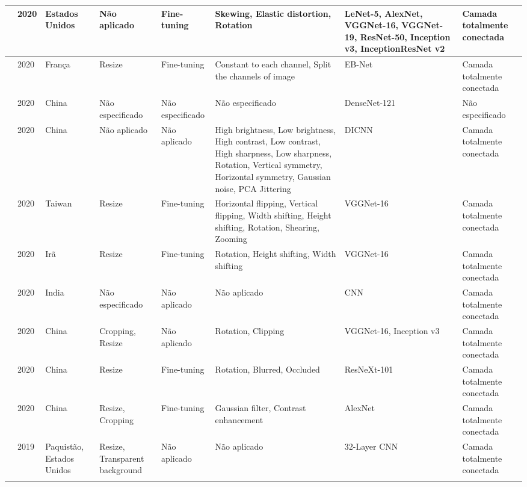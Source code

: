 \documentclass[
	12pt,				%
	oneside,			%
	a4paper,			%
	english,			%
	brazil				%
	]{abntex2ppgsi}
\begin{document}
\begin{landscape}
\begin{OnehalfSpacing}
\begin{footnotesize}
\begin{longtable}{|p{2.3cm}|p{1.3cm}|p{2cm}|p{2.6cm}|p{2.4cm}|p{4.3cm}|p{4.3cm}|p{2.5cm}|}
\cite{liu2020classification} &
  2020 &
  Estados Unidos &
  Não aplicado &
  Fine-tuning &
  Skewing, Elastic distortion, Rotation &
  LeNet-5, AlexNet, VGGNet-16, VGGNet-19, ResNet-50, Inception v3, InceptionResNet v2 &
  Camada totalmente conectada \\ \hline
\cite{le2020automated} &
  2020 &
  França & 
  Resize &
  Fine-tuning &
  Constant to each channel, Split the channels of image &
  EB-Net &
  Camada totalmente conectada \\ \hline
\cite{zhangautomatic} &
  2020 &
  China &
  Não especificado &
  Não especificado &
  Não especificado &
  DenseNet-121 &
  Não especificado \\ \hline
\cite{liu2020grape} &
  2020 &
  China &
  Não aplicado &
  Não aplicado &
  High brightness, Low brightness, High contrast, Low contrast, High sharpness, Low sharpness, Rotation, Vertical symmetry, Horizontal symmetry, Gaussian noise, PCA Jittering &
  DICNN &
  Camada totalmente conectada \\ \hline
\cite{lu2020identifying} &
  2020 &
  Taiwan &
  Resize &
  Fine-tuning &
  Horizontal flipping, Vertical flipping, Width shifting, Height shifting, Rotation, Shearing, Zooming &
  VGGNet-16 &
  Camada totalmente conectada \\ \hline
\cite{banan2020deep} &
  2020 &
  Irã &
  Resize &
  Fine-tuning &
  Rotation, Height shifting, Width shifting &
  VGGNet-16 &
  Camada totalmente conectada \\ \hline
\cite{tiwari2020comparative} &
  2020 &
  India &
  Não especificado &
  Não aplicado &
  Não aplicado &
  CNN &
  Camada totalmente conectada \\ \hline
\cite{li2020using} &
  2020 &
  China &
  Cropping, Resize &
  Não aplicado &
  Rotation, Clipping &
  VGGNet-16, Inception v3 &
  Camada totalmente conectada \\ \hline
\cite{chen2020research} &
  2020 &
  China &
  Resize &
  Fine-tuning &
  Rotation, Blurred, Occluded &
  ResNeXt-101 &
  Camada totalmente conectada \\ \hline
\cite{hongclassification} &
  2020 &
  China &
  Resize, Cropping &
  Fine-tuning &
  Gaussian filter, Contrast enhancement &
  AlexNet &
  Camada totalmente conectada \\ \hline
\cite{rauf2019visual} &
  2019 &
  Paquistão, Estados Unidos &
  Resize, Transparent background &
  Não aplicado &
  Não aplicado &
  32-Layer CNN &
  Camada totalmente conectada \\ \hline
\cite{gomez2019coral} &

\end{longtable}
\end{footnotesize}
\end{OnehalfSpacing}
\end{landscape}
\end{document}
